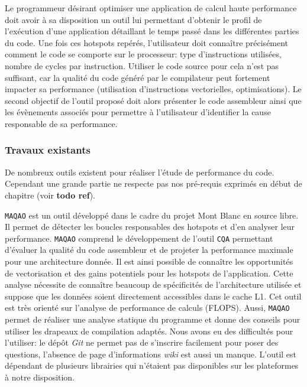         Le programmeur désirant optimiser une application de calcul haute performance doit avoir à sa disposition un outil lui permettant d'obtenir le profil de l'exécution d'une application détaillant le temps passé dans les différentes parties du code. Une fois ces \glspl{hotspot} repérés, l'utilisateur doit connaître précisément comment le code se comporte sur le processeur: type d'instructions utilisées, nombre de cycles par instruction. Utiliser le code source pour cela n'est pas suffisant, car la qualité du code généré par le compilateur peut fortement impacter sa performance (utilisation d'instructions vectorielles, optimisations). Le second objectif de l'outil proposé doit alors présenter le code assembleur ainsi que les évènements associés pour permettre à l'utilisateur d'identifier la cause responsable de sa performance.
        
        



    \subsubsection{Travaux existants}
        
        De nombreux outils existent pour réaliser l'étude de performance du code. Cependant une grande partie ne respecte pas nos pré-requis exprimés en début de chapitre (voir \textbf{todo ref}). 
        
        \verb=MAQAO= \cite{Barthou2010} est un outil développé dans le cadre du projet Mont Blanc \cite{Puzovic2012} en source libre.  Il permet de détecter les boucles responsables des \glspl{hotspot} et d’en analyser leur performance. \verb=MAQAO= comprend le développement de l’outil \verb=CQA= \cite{charif2014cqa} permettant d’évaluer la qualité du code assembleur et de projeter la performance maximale pour une architecture donnée.  Il est ainsi possible de connaître  les opportunités de vectorisation et des gains potentiels pour les \glspl{hotspot} de l'application. Cette analyse nécessite de connaître beaucoup de spécificités de l'architecture utilisée et suppose que les données soient directement accessibles dans le cache L1. Cet outil est très orienté sur l'analyse de performance de calculs (\gls{FLOPS}). Aussi, \verb=MAQAO= permet de réaliser une analyse statique du programme et donne des conseils pour utiliser les drapeaux de compilation adaptés.
        Nous avons eu des difficultés pour l'utiliser: le dépôt \textit{Git} ne permet pas de s'inscrire facilement pour poser des questions, l'absence de page d'informations \textit{wiki} est aussi un manque. L'outil est dépendant de plusieurs librairies qui n'étaient pas disponibles sur les plateformes à notre disposition.
        
